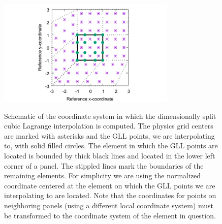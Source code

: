 \documentclass[twocol]{ametsoc}
\begin{document}
\begin{figure}[t]
\begin{center}
\noindent\includegraphics[width=20pc,angle=0]{figs/mapping/mapping.pdf}\\
\end{center}
\caption{Schematic of the coordinate system in which the dimensionally split cubic Lagrange interpolation is computed.  The physics grid centers are marked with asterisks and the GLL points, we are interpolating to, with solid filled circles. The element in which the GLL points are located is  bounded by  thick black lines and located in the lower left corner of a panel. The stippled lines mark the boundaries of the remaining elements. For simplicity we are using the normalized coordinate centered at the element on which the GLL points we are interpolating to are located. Note that the coordinates for points on neighboring panels (using a different local coordinate system) must be transformed to the coordinate system of the element in question.}
\label{fig:mapping}
\end{figure}




\end{document}
